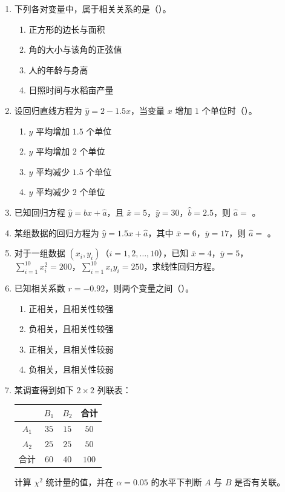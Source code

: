\documentclass[12pt, a4paper]{ctexart}
\begin{document}
\begin{enumerate}
  \item 下列各对变量中，属于相关关系的是（\quad）。
  \begin{enumerate}[label=A.]
    \item 正方形的边长与面积
    \item 角的大小与该角的正弦值
    \item 人的年龄与身高
    \item 日照时间与水稻亩产量
  \end{enumerate}

  \item 设回归直线方程为 $\hat{y} = 2 - 1.5x$，当变量 $x$ 增加 $1$ 个单位时（\quad）。
  \begin{enumerate}[label=A.]
    \item $y$ 平均增加 $1.5$ 个单位
    \item $y$ 平均增加 $2$ 个单位
    \item $y$ 平均减少 $1.5$ 个单位
    \item $y$ 平均减少 $2$ 个单位
  \end{enumerate}

  \item 已知回归方程 $\hat{y} = \hat{b}x + \hat{a}$，且 $\bar{x} = 5$，$\bar{y} = 30$，$\hat{b} = 2.5$，则 $\hat{a} = $ \underline{\qquad}。

  \item 某组数据的回归方程为 $\hat{y} = 1.5x + \hat{a}$，其中 $\bar{x} = 6$，$\bar{y} = 17$，则 $\hat{a} = $ \underline{\qquad}。

  \item 对于一组数据 $(x_i, y_i)$（$i=1,2,\ldots,10$），已知 $\bar{x}=4$，$\bar{y}=5$，$\sum_{i=1}^{10}x_i^2 = 200$，$\sum_{i=1}^{10}x_iy_i = 250$，求线性回归方程。

  \item 已知相关系数 $r = -0.92$，则两个变量之间（\quad）。
  \begin{enumerate}[label=A.]
    \item 正相关，且相关性较强
    \item 负相关，且相关性较强
    \item 正相关，且相关性较弱
    \item 负相关，且相关性较弱
  \end{enumerate}

  \item 某调查得到如下 $2\times2$ 列联表：
  \begin{center}
  \begin{tabular}{c|cc|c}
  \toprule
   & $B_1$ & $B_2$ & 合计 \\
  \midrule
  $A_1$ & $35$ & $15$ & $50$ \\
  $A_2$ & $25$ & $25$ & $50$ \\
  \midrule
  合计 & $60$ & $40$ & $100$ \\
  \bottomrule
  \end{tabular}
  \end{center}
  计算 $\chi^2$ 统计量的值，并在 $\alpha=0.05$ 的水平下判断 $A$ 与 $B$ 是否有关联。


\end{enumerate}
\end{document}
